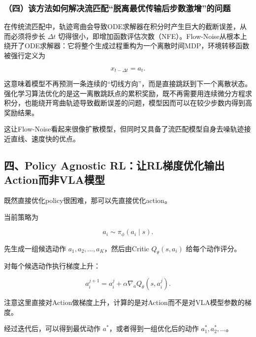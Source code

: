 \hypertarget{ux56dbux8be5ux65b9ux6cd5ux5982ux4f55ux89e3ux51b3ux6d41ux5339ux914dux8131ux79bbux6700ux4f18ux4f20ux8f93ux540eux6b65ux6570ux6fc0ux589eux7684ux95eeux9898}{%
\subsubsection{（四）该方法如何解决流匹配``脱离最优传输后步数激增''的问题}\label{ux56dbux8be5ux65b9ux6cd5ux5982ux4f55ux89e3ux51b3ux6d41ux5339ux914dux8131ux79bbux6700ux4f18ux4f20ux8f93ux540eux6b65ux6570ux6fc0ux589eux7684ux95eeux9898}}

在传统流匹配中，轨迹弯曲会导致ODE求解器在积分时产生巨大的截断误差，从而必须将步长 \(\Delta t\) 切得很小，即增加函数评估次数（NFE）。Flow-Noise从根本上绕开了ODE求解器：它将整个生成过程重构为一个离散时间MDP，环境转移函数被强行定义为

\[
x_{t-\Delta t}=a_t.
\]

这意味着模型不再预测一条连续的``切线方向''，而是直接跳跃到下一个离散状态。强化学习算法优化的是这一离散跳跃点的累积奖励，既不再需要用连续微分方程求积分，也能绕开弯曲轨迹导致截断误差的问题，模型因而可以在较少步数内得到高奖励结果。

这让Flow-Noise看起来很像扩散模型，但同时又具备了流匹配模型自身去噪轨迹接近直线、速度快的优点。

\hypertarget{ux56dbpolicy-agnostic-rlux8ba9rlux68afux5ea6ux4f18ux5316ux8f93ux51faactionux800cux975evlaux6a21ux578b}{%
\subsection{四、Policy Agnostic RL：让RL梯度优化输出Action而非VLA模型}\label{ux56dbpolicy-agnostic-rlux8ba9rlux68afux5ea6ux4f18ux5316ux8f93ux51faactionux800cux975evlaux6a21ux578b}}

既然直接优化policy很困难，那可以先直接优化action。

当前策略为

\[
a_i\sim\pi_\phi(a_i\mid s).
\]

先生成一组候选动作 \(a_1,a_2,\ldots,a_K\)，然后由Critic \(Q_\theta(s,a_i)\) 给每个动作评分。

对每个候选动作执行梯度上升：

\[
a_i^{j+1}=a_i^j+\alpha\nabla_a Q_\theta(s,a_i^j).
\]

注意这里直接对Action做梯度上升，计算的是对Action而不是对VLA模型参数的梯度。

经过迭代后，可以得到最优动作 \(a^\ast\)，或者得到一组优化后的动作 \(a_1^\ast,a_2^\ast,\ldots\)。

